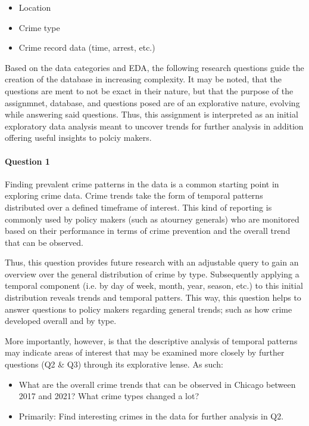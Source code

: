 \documentclass[a4paper]{article}
\begin{document}
\begin{itemize}
  \item Location
  \item Crime type
  \item Crime record data (time, arrest, etc.)
\end{itemize}

Based on the data categories and EDA, the following research questions guide the creation of the database in increasing complexity. It may be noted, that the questions are ment to not be exact in their nature, but that the purpose of the assignmnet, database, and questions posed are of an explorative nature, evolving while answering said questions. Thus, this assignment is interpreted as an initial exploratory data analysis meant to uncover trends for further analysis in addition offering useful insights to polciy makers. 

\paragraph{Question 1} Finding prevalent crime patterns in the data is a common starting point in exploring crime data. Crime trends take the form of temporal patterns distributed over a defined timeframe of interest. This kind of reporting is commonly used by policy makers (such as atourney generals) who are monitored based on their performance in terms of crime prevention and the overall trend that can be observed. 

Thus, this question provides future research with an adjustable query to gain an overview over the general distribution of crime by type. Subsequently applying a temporal component (i.e. by day of week,  month, year, season, etc.) to this initial distribution reveals trends and temporal patters. This way, this question helps to answer questions to policy makers regarding general trends; such as how crime developed overall and by type. 

More importantly, however, is that the descriptive analysis of temporal patterns may indicate areas of interest that may be examined more closely by further questions (Q2 \& Q3) through its explorative lense. As such:

\begin{itemize}
  \item What are the overall crime trends that can be observed in Chicago between 2017 and 2021? What crime types changed a lot? 
    \item Primarily: Find interesting crimes in the data for further analysis in Q2.
\end{itemize}
\end{document}
